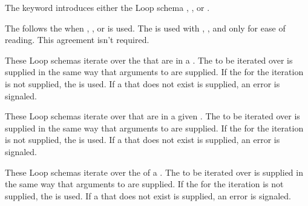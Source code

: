 \beginlist
 
 
The keyword  introduces either the Loop schema 
, ,  or .
 
 
The  
follows the   when , 
, or  is used.  
The   is used with , 
, and  only for ease of reading.
This agreement isn't required.
 
 
These Loop schemas iterate over the  
that are  in a .
The  to be iterated over is supplied in the same way
that  arguments to  are supplied.  
If the  for the iteration is not supplied, 
the  is used.  
If a  that does not exist is supplied, 
an error  is signaled.
 
 
These Loop schemas iterate over  that are
 in a given .  
The  to be iterated over is supplied in the same way
that  arguments to  are supplied.
If the  for the iteration is not supplied, 
the  is used.
If a  that does not exist is supplied, 
an error  is signaled.
 
 
These Loop schemas iterate over the  of a .
The  to be iterated over is supplied in the same way
that  arguments to  are supplied.
If the  for the iteration is not supplied, 
the  is used.
If a  that does not exist is supplied, 
an error  is signaled.
 
